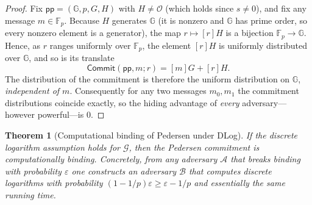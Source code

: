 \documentclass[11pt,a4paper]{article}
\newtheorem{theorem}{Theorem}[section]
\theoremstyle{definition}
\theoremstyle{remark}
\newcommand{\G}{\ensuremath{\mathbb{G}}}
\newcommand{\Fp}{\ensuremath{\mathbb{F}_{p}}}
\begin{document}
\begin{proof}
Fix \(\mathsf{pp} = (\G, p, G, H)\) with \(H \neq \mathcal{O}\) (which holds since \(s \neq 0\)), and fix any message \(m \in \Fp\). Because \(H\) generates \(\G\) (it is nonzero and \(\G\) has prime order, so every nonzero element is a generator), the map \(r \mapsto [r]H\) is a bijection \(\Fp \to \G\). Hence, as \(r\) ranges uniformly over \(\Fp\), the element \([r]H\) is uniformly distributed over \(\G\), and so is its translate
\[
  \mathsf{Commit}(\mathsf{pp}, m; r) = [m]G + [r]H.
\]
The distribution of the commitment is therefore the uniform distribution on \(\G\), \emph{independent of \(m\)}. Consequently for any two messages \(m_0, m_1\) the commitment distributions coincide exactly, so the hiding advantage of \emph{every} adversary---however powerful---is \(0\).
\end{proof}

\begin{theorem}[Computational binding of Pedersen under DLog]\label{commitments:thm:pedersen-binding}
If the discrete logarithm assumption holds for \(\mathcal{G}\), then the Pedersen commitment is computationally binding. Concretely, from any adversary \(\mathcal{A}\) that breaks binding with probability \(\varepsilon\) one constructs an adversary \(\mathcal{B}\) that computes discrete logarithms with probability \((1-1/p)\varepsilon \ge \varepsilon - 1/p\) and essentially the same running time.
\end{theorem}
\end{document}

